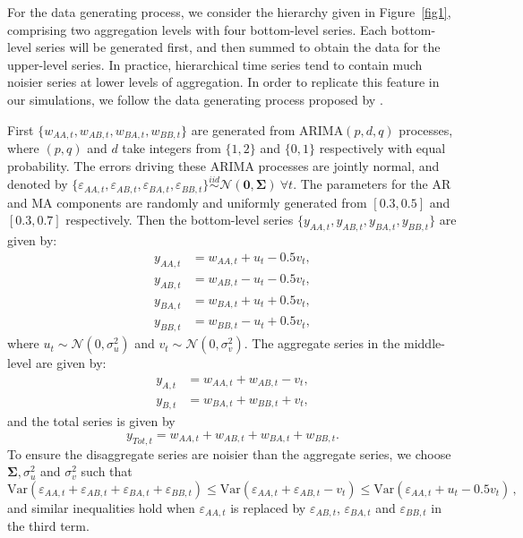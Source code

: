 \documentclass[a4paper, 11pt]{article}
\def\var{\text{Var}}
\theoremstyle{definition}
\begin{document}
For the data generating process, we consider the hierarchy given in Figure~\ref{fig1}, comprising two aggregation levels with four bottom-level series. Each bottom-level series will be generated first, and then summed to obtain the data for the upper-level series. In practice, hierarchical time series tend to contain much noisier series at lower levels of aggregation. In order to replicate this feature in our simulations, we follow the data generating process proposed by \citet{Wickramasuriya2017}.

First $\{w_{AA,t},w_{AB,t},w_{BA,t},w_{BB,t}\}$ are generated from ARIMA$(p,d,q)$ processes, where $(p,q)$ and $d$ take integers from $\{1,2\}$ and $\{0,1\}$ respectively with equal probability. The errors driving these ARIMA processes are jointly normal, and denoted by $\{\varepsilon_{AA,t},\varepsilon_{AB,t},\varepsilon_{BA,t},\varepsilon_{BB,t}\} \overset{iid}{\sim} \mathcal{N}(\bm{0}, \bm{\Sigma})~\forall t$. The parameters for the AR and MA components are randomly and uniformly generated from $[0.3,0.5]$ and $[0.3,0.7]$ respectively. Then the bottom-level series $\{y_{AA,t},y_{AB,t},y_{BA,t},y_{BB,t}\}$ are given by:
\begin{align*}
y_{AA,t} &= w_{AA,t} + u_t - 0.5v_t,\\
y_{AB,t} &= w_{AB,t} - u_t - 0.5v_t,\\
y_{BA,t} &= w_{BA,t} + u_t + 0.5v_t,\\
y_{BB,t} &= w_{BB,t} - u_t + 0.5v_t,
\end{align*}
where $u_t \sim \mathcal{N}(0,\sigma^2_u)$ and $v_t \sim \mathcal{N}(0,\sigma^2_v)$. The aggregate series in the middle-level are given by:
\begin{align*}
y_{A,t} &= w_{AA,t} + w_{AB,t} - v_t,\\
y_{B,t} &= w_{BA,t} + w_{BB,t} + v_t,
\end{align*}
and the total series is given by
\[
  y_{Tot,t} = w_{AA,t} + w_{AB,t} + w_{BA,t} + w_{BB,t}.
\]
To ensure the disaggregate series are noisier than the aggregate series, we choose $\bm{\Sigma}, \sigma^2_u$ and $\sigma^2_v$ such that
\[
  \var(\varepsilon_{AA,t} + \varepsilon_{AB,t} + \varepsilon_{BA,t} + \varepsilon_{BB,t})
  \le \var(\varepsilon_{AA,t}+\varepsilon_{AB,t}-v_t)
  \le \var(\varepsilon_{AA,t}+u_t-0.5v_t)\,,
\]
and similar inequalities hold when $\varepsilon_{AA,t}$ is replaced by $\varepsilon_{AB,t}$, $\varepsilon_{BA,t}$ and $\varepsilon_{BB,t}$ in the third term.
\end{document}
